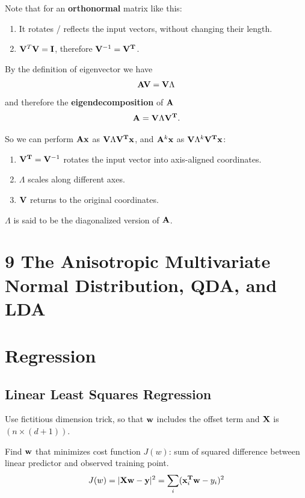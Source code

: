 \documentclass[12pt]{article}
\begin{document}
Note that for an \textbf{orthonormal} matrix like this:
\begin{enumerate}
\item It rotates / reflects the input vectors, without changing their length.
\item  $\mathbf V^T\mathbf V = \mathbf I$, therefore $\mathbf V^{-1} = \mathbf V^{\mathbf{T}}$.
\end{enumerate}


By the definition of eigenvector we have
\begin{align*}
  \mathbf A\mathbf V = \mathbf V\Lambda
\end{align*}
and therefore the \textbf{eigendecomposition} of $\mathbf A$
\begin{align*}
  \mathbf A = \mathbf V\Lambda\mathbf V^{\mathbf{T}}.
\end{align*}

So we can perform $\mathbf A\mathbf x$ as $\mathbf V\Lambda\mathbf V^{\mathbf{T}}\mathbf x$, and $\mathbf A^k\mathbf x$ as
$\mathbf V\Lambda^k\mathbf V^{\mathbf{T}}\mathbf x$:

\begin{enumerate}
\item $\mathbf V^{\mathbf{T}} = \mathbf V^{-1}$ rotates the input vector into axis-aligned coordinates.
\item $\Lambda$ scales along different axes.
\item $\mathbf V$ returns to the original coordinates.
\end{enumerate}

$\Lambda$ is said to be the diagonalized version of $\mathbf A$.
\section*{9 The Anisotropic Multivariate Normal Distribution, QDA, and LDA}

\newpage
\section{Regression}
\subsection{Linear Least Squares Regression}
Use fictitious dimension trick, so that $\mathbf w$ includes the offset term and $\mathbf X$
is $(n \times (d + 1))$.
\\
\begin{mdframed}
Find $\mathbf w$ that minimizes cost function $J(w)$: sum of squared difference between
linear predictor and observed training point.
\begin{align*}
  J(w) = |\mathbf X \mathbf w - \mathbf y|^2 = \sum_i (\mathbf x_i^{\mathbf{T}}\mathbf w - y_i)^2
\end{align*}
\end{mdframed}
\end{document}
